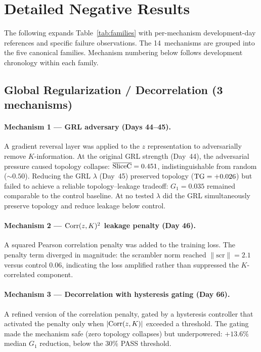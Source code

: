 
\appendix

\section{Detailed Negative Results}
\label{app:negative}

The following expands Table~\ref{tab:families} with per-mechanism development-day references and specific failure observations. The 14~mechanisms are grouped into the five canonical families. Mechanism numbering below follows development chronology within each family.

\subsection{Global Regularization / Decorrelation (3 mechanisms)}

\paragraph{Mechanism 1 --- GRL adversary (Days 44--45).} A gradient reversal layer was applied to the $z$ representation to adversarially remove $K$-information. At the original GRL strength (Day~44), the adversarial pressure caused topology collapse: $\overline{\mathrm{SliceC}} = 0.451$, indistinguishable from random (${\sim}0.50$). Reducing the GRL $\lambda$ (Day~45) preserved topology ($\mathrm{TG} = +0.026$) but failed to achieve a reliable topology--leakage tradeoff: $G_1 = 0.035$ remained comparable to the control baseline. At no tested $\lambda$ did the GRL simultaneously preserve topology and reduce leakage below control.

\paragraph{Mechanism 2 --- $\mathrm{Corr}(z, K)^2$ leakage penalty (Day 46).} A squared Pearson correlation penalty was added to the training loss. The penalty term diverged in magnitude: the scrambler norm reached $\|\mathrm{scr}\| = 2.1$ versus control $0.06$, indicating the loss amplified rather than suppressed the $K$-correlated component.

\paragraph{Mechanism 3 --- Decorrelation with hysteresis gating (Day 66).} A refined version of the correlation penalty, gated by a hysteresis controller that activated the penalty only when $|\mathrm{Corr}(z, K)|$ exceeded a threshold. The gating made the mechanism safe (zero topology collapses) but underpowered: $+13.6\%$ median $G_1$ reduction, below the $30\%$ PASS threshold.

